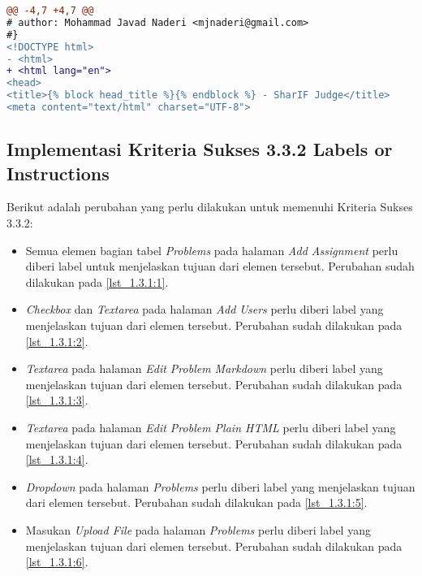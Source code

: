 \begin{lstlisting}[language=diff, caption=Perubahan pada \textit{file} \textit{base.twig}, label=lst_3.1.1:1, basicstyle=\ttfamily, frame=single,
columns=fullflexible, keepspaces=true, breaklines=true]
@@ -4,7 +4,7 @@
# author: Mohammad Javad Naderi <mjnaderi@gmail.com>
#}
<!DOCTYPE html>
- <html>
+ <html lang="en">
<head>
<title>{% block head_title %}{% endblock %} - SharIF Judge</title>
<meta content="text/html" charset="UTF-8">
\end{lstlisting}

\subsection{Implementasi Kriteria Sukses 3.3.2 Labels or Instructions}
\label{subsec:implementasi_A_3.3.2}

Berikut adalah perubahan yang perlu dilakukan untuk memenuhi Kriteria Sukses 3.3.2:

\begin{itemize}
	\item Semua elemen bagian tabel \textit{Problems} pada halaman \textit{Add Assignment} perlu diberi label untuk menjelaskan tujuan dari elemen tersebut. Perubahan sudah dilakukan pada \ref{lst_1.3.1:1}.
	
	\item \textit{Checkbox} dan \textit{Textarea} pada halaman \textit{Add Users} perlu diberi label yang menjelaskan tujuan dari elemen tersebut. Perubahan sudah dilakukan pada \ref{lst_1.3.1:2}.
	
	\item \textit{Textarea} pada halaman \textit{Edit Problem Markdown} perlu diberi label yang menjelaskan tujuan dari elemen tersebut. Perubahan sudah dilakukan pada \ref{lst_1.3.1:3}.
	
	\item \textit{Textarea} pada halaman \textit{Edit Problem Plain HTML} perlu diberi label yang menjelaskan tujuan dari elemen tersebut. Perubahan sudah dilakukan pada \ref{lst_1.3.1:4}.
	
	\item \textit{Dropdown} pada halaman \textit{Problems} perlu diberi label yang menjelaskan tujuan dari elemen tersebut. Perubahan sudah dilakukan pada \ref{lst_1.3.1:5}.
	
	\item Masukan \textit{Upload File} pada halaman \textit{Problems} perlu diberi label yang menjelaskan tujuan dari elemen tersebut. Perubahan sudah dilakukan pada \ref{lst_1.3.1:6}.
\end{itemize}

